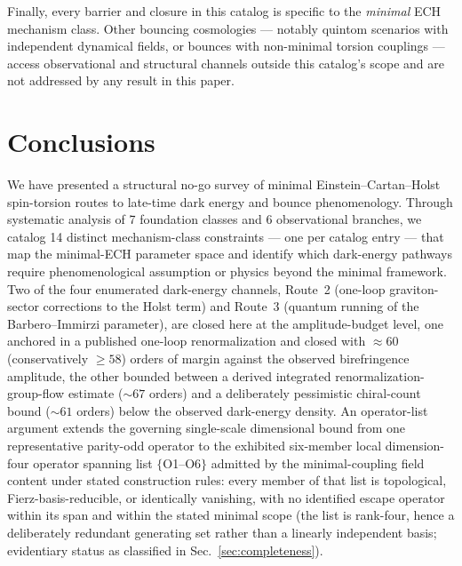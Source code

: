 \documentclass[aps,prd,twocolumn,superscriptaddress,showpacs,preprintnumbers,nofootinbib,longbibliography,floatfix]{revtex4-2}
\begin{document}
Finally, every barrier and closure in this catalog is specific to the
\emph{minimal} ECH mechanism class. Other bouncing cosmologies --- notably
quintom scenarios with independent dynamical fields, or bounces with
non-minimal torsion couplings --- access observational and structural
channels outside this catalog's scope and are not addressed by any result
in this paper.

\section{Conclusions}\label{sec:conclusions}

We have presented a structural no-go survey of minimal Einstein--Cartan--Holst
spin-torsion routes to late-time dark energy and bounce phenomenology.
Through systematic analysis of 7 foundation classes and 6 observational
branches, we catalog 14 distinct mechanism-class constraints --- one per
catalog entry --- that map the minimal-ECH parameter space and
identify which dark-energy pathways require phenomenological assumption or
physics beyond the minimal framework. Two of the four enumerated dark-energy
channels, Route~2 (one-loop graviton-sector corrections to the Holst term)
and Route~3 (quantum running of the Barbero--Immirzi parameter), are closed
here at the amplitude-budget level, one anchored in a published one-loop
renormalization and closed with ${\approx}60$ (conservatively $\geq 58$)
orders of margin against the observed birefringence amplitude, the other
bounded between a derived integrated renormalization-group-flow
estimate (${\sim}67$ orders) and a deliberately pessimistic
chiral-count bound (${\sim}61$ orders) below the observed dark-energy
density. An operator-list argument
extends the governing single-scale dimensional bound from one representative
parity-odd operator to the exhibited six-member local dimension-four
operator spanning list $\{$O1--O6$\}$ admitted by the minimal-coupling field
content under stated construction rules: every member of that list
is topological, Fierz-basis-reducible, or identically vanishing, with no
identified escape operator within its span and within the stated minimal
scope (the list is rank-four, hence a deliberately redundant generating
set rather than a linearly independent basis; evidentiary status as
classified in Sec.~\ref{sec:completeness}).
\end{document}
